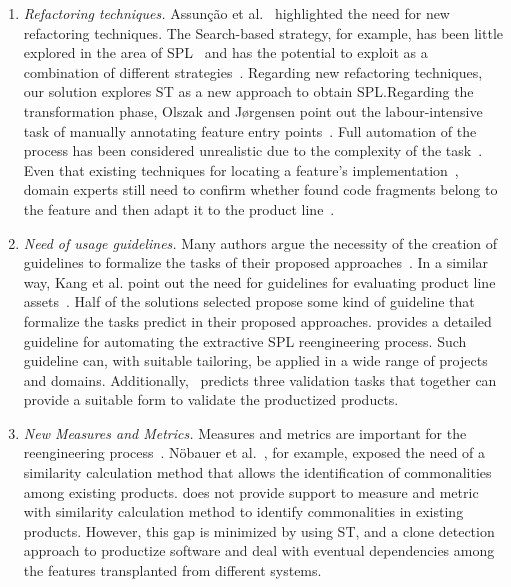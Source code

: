 \begin{enumerate}
    \item \emph{Refactoring techniques.} Assunção et al.~\cite{Assuncao2017} highlighted the need for new refactoring techniques. The Search-based strategy, for example, has been little explored in the area of SPL~\cite{Lopez2015} and has the potential to exploit as a combination of different strategies~\cite{Harman2014a}. Regarding new refactoring techniques, our solution explores ST as a new approach to obtain SPL.Regarding the transformation phase, Olszak and Jørgensen point out the labour-intensive task of manually annotating feature entry points~\cite{Olszak2012}. Full automation of the process has been considered unrealistic due to the complexity of the task~\cite{Biggerstaff1993, Kastner2011, Lopez2011}. Even that existing techniques for locating a feature’s implementation~\cite{Harman2002,Komondoor2000,Lanubile1997}, domain experts still need to confirm whether found code fragments belong to the feature and then adapt it to the product line~\cite{Kastner2011}. 
    
    \item \emph{Need of usage guidelines.} Many authors argue the necessity of the creation of guidelines to formalize the tasks of their proposed approaches~\cite{Assuncao2017}. In a similar way,  Kang et al. point out the need for guidelines for evaluating product line assets~\cite{Kang2005}. Half of the solutions selected propose some kind of guideline that formalize the tasks predict in their proposed approaches. \FOUNDRY provides a detailed guideline for automating the extractive SPL reengineering process. Such guideline can, with suitable tailoring, be applied in a wide range of projects and domains. Additionally, \FOUNDRY~predicts three validation tasks that together can provide a suitable form to validate the productized products.

   \item \emph{New Measures and Metrics.} Measures and metrics are important for the reengineering process~\cite{Assuncao2017}. Nöbauer et al.~\cite{Nobauer2014}, for example, exposed the need of a similarity calculation method that allows the identification of commonalities among existing products. \FOUNDRY does not provide support to measure and metric with similarity calculation method to identify commonalities in existing products. However, this gap is minimized by using ST, and a clone detection approach to productize software and deal with eventual dependencies among the features transplanted from different systems.


\end{enumerate}
